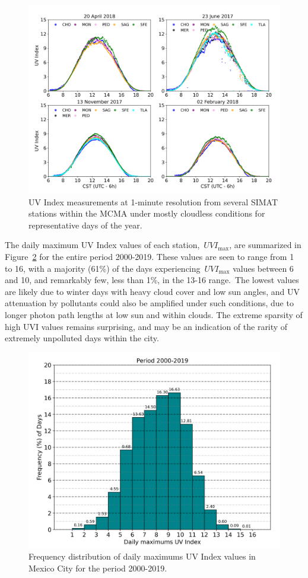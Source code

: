 \documentclass[journal=jacsat,manuscript=article]{achemso}
\begin{document}
\begin{figure}[H]
  \begin{center}
    \includegraphics[width=0.70\columnwidth]{figures/season}
    \caption{{UV Index measurements at 1-minute resolution from several SIMAT stations within the MCMA
          under mostly cloudless conditions for representative days of the year.
            {\label{628947}}%
        }}
  \end{center}
\end{figure}

The daily maximum UV Index values of each station,~\(UVI_{\max}\),
are summarized in Figure~{\ref{461017}} for the entire period 2000-2019.
These values are seen to range
from 1 to 16, with a majority (61\%) of the days
experiencing~\(UVI_{\max}\) values between 6 and 10, and remarkably
few, less than 1\%, in the 13-16 range.~The lowest values are
likely due to winter days with heavy cloud cover and low sun angles, and
UV attenuation by pollutants could also be amplified under such
conditions, due to longer photon path lengths at low sun and within
clouds. The extreme sparsity of high UVI values remains surprising, and
may be an indication of the rarity of extremely unpolluted days within
the city.

\begin{figure}[H]
  \begin{center}
    \includegraphics[width=0.49\columnwidth]{figures/Histogram}
    \caption{{Frequency distribution of daily maximums UV Index values in Mexico City
    for the period 2000-2019.
    {\label{461017}}%
    }}
  \end{center}
\end{figure}
\end{document}

